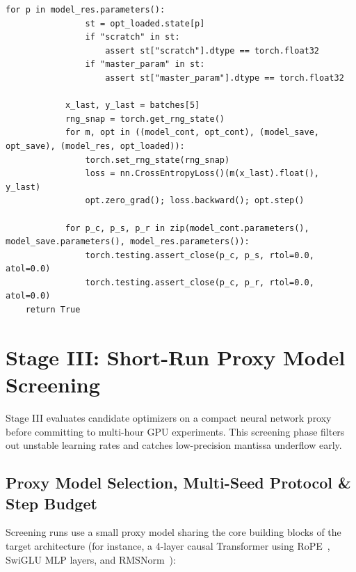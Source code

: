 \documentclass[11pt,a4paper]{article}
\renewcommand{\_}{\origunderscore\allowbreak}
\begin{document}
\begin{lstlisting}[caption={Standard LSO-Eval Stage II: Checkpoint Roundtrip \& State Cleanup Test (v1.1.1)}, label={lst:checkpoint_test}]
            for p in model_res.parameters():
                st = opt_loaded.state[p]
                if "scratch" in st:
                    assert st["scratch"].dtype == torch.float32
                if "master_param" in st:
                    assert st["master_param"].dtype == torch.float32

            x_last, y_last = batches[5]
            rng_snap = torch.get_rng_state()
            for m, opt in ((model_cont, opt_cont), (model_save, opt_save), (model_res, opt_loaded)):
                torch.set_rng_state(rng_snap)
                loss = nn.CrossEntropyLoss()(m(x_last).float(), y_last)
                opt.zero_grad(); loss.backward(); opt.step()

            for p_c, p_s, p_r in zip(model_cont.parameters(), model_save.parameters(), model_res.parameters()):
                torch.testing.assert_close(p_c, p_s, rtol=0.0, atol=0.0)
                torch.testing.assert_close(p_c, p_r, rtol=0.0, atol=0.0)
    return True
\end{lstlisting}

\section{Stage III: Short-Run Proxy Model Screening}
\noindent
Stage III evaluates candidate optimizers on a compact neural network proxy before committing to multi-hour GPU experiments. This screening phase filters out unstable learning rates and catches low-precision mantissa underflow early.

\subsection{Proxy Model Selection, Multi-Seed Protocol \& Step Budget}
\noindent
Screening runs use a small proxy model sharing the core building blocks of the target architecture (for instance, a 4-layer causal Transformer using RoPE~\cite{su2024roformer}, SwiGLU MLP layers, and RMSNorm~\cite{zhang2019rmsnorm}):
\end{document}
